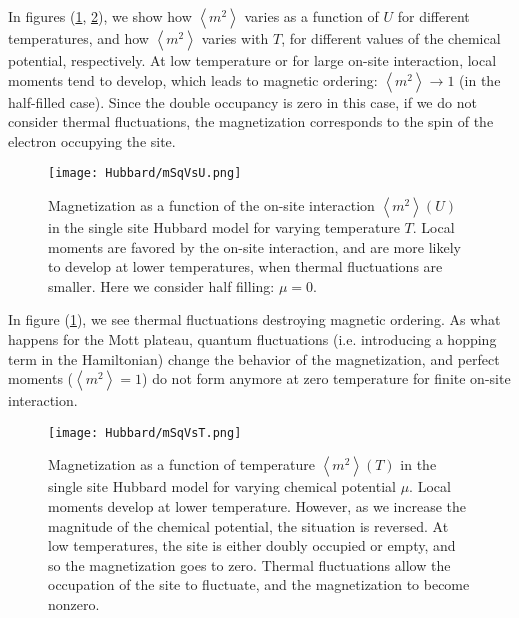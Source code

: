 In figures (\ref{fig:mSqVsU}, \ref{fig:mSqVsT}), we show how $\left\langle m^2 \right\rangle$ varies as a function of $U$ for different temperatures, and how $\left\langle m^2 \right\rangle$ varies with $T$, for different values of the chemical potential, respectively.
At low temperature or for large on-site interaction, local moments tend to develop, which leads to magnetic ordering: $\left\langle m^2 \right\rangle \rightarrow 1$ (in the half-filled case).
Since the double occupancy is zero in this case, if we do not consider thermal fluctuations, the magnetization corresponds to the spin of the electron occupying the site.

\begin{figure}[H]
	\centering
\hspace{12mm}\texttt{[image: Hubbard/mSqVsU.png]}
	\caption[Magnetization as a function of the on-site interaction $\left\langle m^2 \right\rangle (U)$ in the single site Hubbard model for varying temperature $T$.]{Magnetization as a function of the on-site interaction $\left\langle m^2 \right\rangle (U)$ in the single site Hubbard model for varying temperature $T$.
	Local moments are favored by the on-site interaction, and are more likely to develop at lower temperatures, when thermal fluctuations are smaller. Here we consider half filling: $\mu = 0$.}
	\label{fig:mSqVsU}
\end{figure}

In figure (\ref{fig:mSqVsU}), we see thermal fluctuations destroying magnetic ordering.
As what happens for the Mott plateau, quantum fluctuations (i.e. introducing a hopping term in the Hamiltonian) change the behavior of the magnetization, and perfect moments ($\left\langle m^2 \right\rangle =1$) do not form anymore at zero temperature for finite on-site interaction.

\begin{figure}[H]
	\centering
\hspace{12mm}\texttt{[image: Hubbard/mSqVsT.png]}
	\caption[Magnetization as a function of temperature $\left\langle m^2 \right\rangle (T)$ in the single site Hubbard model for varying chemical potential $\mu$.]{Magnetization as a function of temperature $\left\langle m^2 \right\rangle (T)$ in the single site Hubbard model for varying chemical potential $\mu$.
	Local moments develop at lower temperature.
	However, as we increase the magnitude of the chemical potential, the situation is reversed.
	At low temperatures, the site is either  doubly occupied or empty, and so the magnetization goes to zero.
	Thermal fluctuations allow the occupation of the site to fluctuate, and the magnetization to become nonzero.}
	\label{fig:mSqVsT}
\end{figure}

